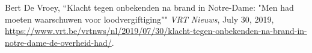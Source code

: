 \documentclass[../main/main.tex]{subfiles}
\begin{document}
\vfill
\begin{thebibliography}{100}  
 Bert De Vroey, ``Klacht tegen onbekenden na brand in Notre-Dame: "Men had moeten waarschuwen voor loodvergiftiging"" \emph{VRT Nieuws}, July 30, 2019, \url{https://www.vrt.be/vrtnws/nl/2019/07/30/klacht-tegen-onbekenden-na-brand-in-notre-dame-de-overheid-had/}.
\end{thebibliography}
\end{document}
